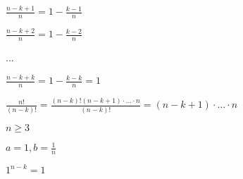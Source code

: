 $\frac{n - k + 1}{n} = 1 - \frac{k - 1}{n}$

$\frac{n - k + 2}{n} = 1 - \frac{k - 2}{n}$

...


$\frac{n - k + k}{n} = 1 - \frac{k - k}{n} = 1$

$\frac{n!}{(n-k)!}= \frac{(n-k)!(n-k+1) \cdot ... \cdot n}{(n - k)!} = (n - k + 1) \cdot ... \cdot n$




$n \geq 3$

$a = 1, b = \frac{1}{n}$

$1^{n - k} = 1$


